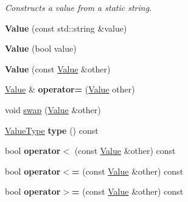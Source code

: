 \begin{DoxyCompactItemize}
\begin{DoxyCompactList}\small\item\em Constructs a value from a static string. \end{DoxyCompactList}\item 
\mbox{\label{class_json_1_1_value_aa4501dd4edf3ce3d5145fc656f088b21}} 
{\bfseries Value} (const std\+::string \&value)
\item 
\mbox{\label{class_json_1_1_value_a350a31ea4a30d384994b0bc010b17495}} 
{\bfseries Value} (bool value)
\item 
\mbox{\label{class_json_1_1_value_a436dfd3670f95fd665f680eba5cebcf0}} 
{\bfseries Value} (const \mbox{\hyperlink{class_json_1_1_value}{Value}} \&other)
\item 
\mbox{\label{class_json_1_1_value_a94ca5ba1f5e152d8ad280b1b54796fdc}} 
\mbox{\hyperlink{class_json_1_1_value}{Value}} \& {\bfseries operator=} (\mbox{\hyperlink{class_json_1_1_value}{Value}} other)
\item 
void \mbox{\hyperlink{class_json_1_1_value_aab841120d78e296e1bc06a373345e822}{swap}} (\mbox{\hyperlink{class_json_1_1_value}{Value}} \&other)
\item 
\mbox{\label{class_json_1_1_value_a8ce61157a011894f0252ceed232312de}} 
\mbox{\hyperlink{namespace_json_a7d654b75c16a57007925868e38212b4e}{Value\+Type}} {\bfseries type} () const
\item 
\mbox{\label{class_json_1_1_value_aac6bd14155b88ed2d39ef54820b39e49}} 
bool {\bfseries operator$<$} (const \mbox{\hyperlink{class_json_1_1_value}{Value}} \&other) const
\item 
\mbox{\label{class_json_1_1_value_a40c411a320a416d5eac0052b36211286}} 
bool {\bfseries operator$<$=} (const \mbox{\hyperlink{class_json_1_1_value}{Value}} \&other) const
\item 
\mbox{\label{class_json_1_1_value_afe2c3e52df60b9622cbd8358b74bdbf5}} 
bool {\bfseries operator$>$=} (const \mbox{\hyperlink{class_json_1_1_value}{Value}} \&other) const
\item 

\end{DoxyCompactItemize}
